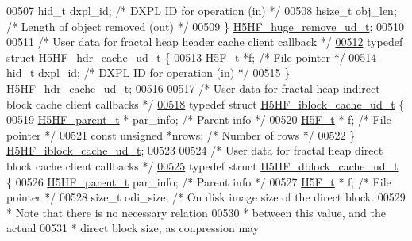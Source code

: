 \begin{DoxyCode}
00507     hid\_t dxpl\_id;              \textcolor{comment}{/* DXPL ID for operation (in) */}
00508     hsize\_t obj\_len;            \textcolor{comment}{/* Length of object removed (out) */}
00509 \} \hyperlink{struct_h5_h_f__huge__remove__ud__t}{H5HF\_huge\_remove\_ud\_t};
00510 
00511 \textcolor{comment}{/* User data for fractal heap header cache client callback */}
\hyperlink{struct_h5_h_f__hdr__cache__ud__t}{00512} \textcolor{keyword}{typedef} \textcolor{keyword}{struct }\hyperlink{struct_h5_h_f__hdr__cache__ud__t}{H5HF\_hdr\_cache\_ud\_t} \{
00513     \hyperlink{struct_h5_f__t}{H5F\_t} *f;                   \textcolor{comment}{/* File pointer */}
00514     hid\_t dxpl\_id;              \textcolor{comment}{/* DXPL ID for operation (in) */}
00515 \} \hyperlink{struct_h5_h_f__hdr__cache__ud__t}{H5HF\_hdr\_cache\_ud\_t};
00516 
00517 \textcolor{comment}{/* User data for fractal heap indirect block cache client callbacks */}
\hyperlink{struct_h5_h_f__iblock__cache__ud__t}{00518} \textcolor{keyword}{typedef} \textcolor{keyword}{struct }\hyperlink{struct_h5_h_f__iblock__cache__ud__t}{H5HF\_iblock\_cache\_ud\_t} \{
00519     \hyperlink{struct_h5_h_f__parent__t}{H5HF\_parent\_t} * par\_info;   \textcolor{comment}{/* Parent info */}
00520     \hyperlink{struct_h5_f__t}{H5F\_t} * f;                  \textcolor{comment}{/* File pointer */}
00521     \textcolor{keyword}{const} \textcolor{keywordtype}{unsigned} *nrows;      \textcolor{comment}{/* Number of rows */}
00522 \} \hyperlink{struct_h5_h_f__iblock__cache__ud__t}{H5HF\_iblock\_cache\_ud\_t};
00523 
00524 \textcolor{comment}{/* User data for fractal heap direct block cache client callbacks */}
\hyperlink{struct_h5_h_f__dblock__cache__ud__t}{00525} \textcolor{keyword}{typedef} \textcolor{keyword}{struct }\hyperlink{struct_h5_h_f__dblock__cache__ud__t}{H5HF\_dblock\_cache\_ud\_t} \{
00526     \hyperlink{struct_h5_h_f__parent__t}{H5HF\_parent\_t} par\_info;     \textcolor{comment}{/* Parent info */}
00527     \hyperlink{struct_h5_f__t}{H5F\_t} * f;                  \textcolor{comment}{/* File pointer */}
00528     \textcolor{keywordtype}{size\_t} odi\_size;        \textcolor{comment}{/* On disk image size of the direct block.}
00529 \textcolor{comment}{                 * Note that there is no necessary relation}
00530 \textcolor{comment}{                 * between this value, and the actual}
00531 \textcolor{comment}{                 * direct block size, as conpression may}

\end{DoxyCode}
